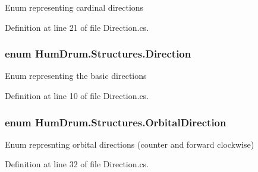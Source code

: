 Enum representing cardinal directions 



Definition at line 21 of file Direction.\+cs.

\subsubsection[{\texorpdfstring{Direction}{Direction}}]{\setlength{\rightskip}{0pt plus 5cm}enum {\bf Hum\+Drum.\+Structures.\+Direction}\hspace{0.3cm}{\ttfamily [strong]}}\hypertarget{namespaceHumDrum_1_1Structures_a83ca1f04475980cb7e79d471cc746dd3}{}\label{namespaceHumDrum_1_1Structures_a83ca1f04475980cb7e79d471cc746dd3}


Enum representing the basic directions 



Definition at line 10 of file Direction.\+cs.

\subsubsection[{\texorpdfstring{Orbital\+Direction}{OrbitalDirection}}]{\setlength{\rightskip}{0pt plus 5cm}enum {\bf Hum\+Drum.\+Structures.\+Orbital\+Direction}\hspace{0.3cm}{\ttfamily [strong]}}\hypertarget{namespaceHumDrum_1_1Structures_a1b5e67f976aea8954390bccad43a9c9e}{}\label{namespaceHumDrum_1_1Structures_a1b5e67f976aea8954390bccad43a9c9e}


Enum represnting orbital directions (counter and forward clockwise) 



Definition at line 32 of file Direction.\+cs.

